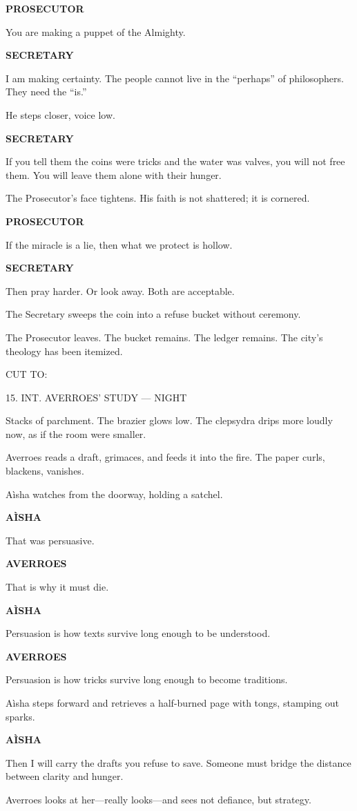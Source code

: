 \documentclass[12pt]{article}
\newlength{\charindent}
\newlength{\dialogueindent}
\newlength{\dialoguewidth}
\newlength{\transitionindent}
\newcommand{\slug}[1]{\vspace{1.25em}\textsc{#1}\vspace{0.5em}}
\newcommand{\action}[1]{#1}
\newcommand{\character}[1]{%
  \par\vspace{0.75em}%
  \hspace*{\charindent}\textbf{#1}%
}
\newcommand{\dialogue}[1]{%
  \par\nobreak
  \hspace*{\dialogueindent}%
  \begin{minipage}[t]{\dialoguewidth}
  #1
  \end{minipage}
}
\newcommand{\transition}[1]{%
  \par\vspace{1em}%
  \hspace*{\transitionindent}\textsc{#1}%
}
\begin{document}
\character{PROSECUTOR}
\dialogue{You are making a puppet of the Almighty.}

\character{SECRETARY}
\dialogue{I am making certainty. The people cannot live in the “perhaps” of philosophers. They need the “is.”}

\action{He steps closer, voice low.}

\character{SECRETARY}
\dialogue{If you tell them the coins were tricks and the water was valves, you will not free them. You will leave them alone with their hunger.}

\action{The Prosecutor’s face tightens. His faith is not shattered; it is cornered.}

\character{PROSECUTOR}
\dialogue{If the miracle is a lie, then what we protect is hollow.}

\character{SECRETARY}
\dialogue{Then pray harder. Or look away. Both are acceptable.}

\action{The Secretary sweeps the coin into a refuse bucket without ceremony.}

\action{The Prosecutor leaves. The bucket remains. The ledger remains. The city’s theology has been itemized.}

\transition{CUT TO:}

\slug{15. INT. AVERROES’ STUDY --- NIGHT}

\action{Stacks of parchment. The brazier glows low. The clepsydra drips more loudly now, as if the room were smaller.}

\action{Averroes reads a draft, grimaces, and feeds it into the fire. The paper curls, blackens, vanishes.}

\action{A\`isha watches from the doorway, holding a satchel.}

\character{A\`ISHA}
\dialogue{That was persuasive.}

\character{AVERROES}
\dialogue{That is why it must die.}

\character{A\`ISHA}
\dialogue{Persuasion is how texts survive long enough to be understood.}

\character{AVERROES}
\dialogue{Persuasion is how tricks survive long enough to become traditions.}

\action{A\`isha steps forward and retrieves a half-burned page with tongs, stamping out sparks.}

\character{A\`ISHA}
\dialogue{Then I will carry the drafts you refuse to save. Someone must bridge the distance between clarity and hunger.}

\action{Averroes looks at her—really looks—and sees not defiance, but strategy.}
\end{document}
